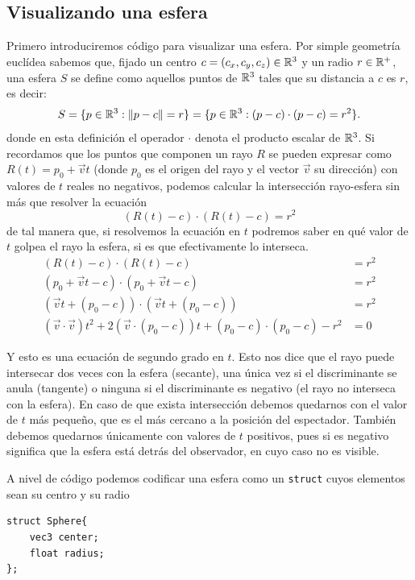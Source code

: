 \subsection{Visualizando una esfera}
\label{subsection:esfera}

Primero introduciremos código para visualizar una esfera. Por simple geometría euclídea sabemos que, fijado un centro $c=(c_x,c_y,c_z)\in\mathbb{R}^3$ y un radio $r\in\mathbb{R}^+$, una esfera $S$ se define como aquellos puntos de $\mathbb{R}^3$ tales que su distancia a $c$ es $r$, es decir:
$$
S = \{p\in\mathbb{R}^3:\|p-c\|=r\} = \{p\in\mathbb{R}^3:(p-c)\cdot (p-c)=r^2\}. 
$$
donde en esta definición el operador $\cdot$ denota el producto escalar de $\mathbb{R}^3$. Si recordamos que los puntos que componen un rayo $R$ se pueden expresar como $R(t)= p_0 + \vec vt$ (donde $p_0$ es el origen del rayo y el vector $\vec v$ su dirección) con valores de $t$ reales no negativos, podemos calcular la intersección rayo-esfera sin más que resolver la ecuación
$$
(R(t)-c)\cdot(R(t)-c)=r^2
$$
de tal manera que, si resolvemos la ecuación en $t$ podremos saber en qué valor de $t$ golpea el rayo la esfera, si es que efectivamente lo interseca.
\begin{equation}
    \label{eq:rayo-recta}
    \begin{split}
        (R(t)-c)\cdot(R(t)-c)&=r^2 \\
        (p_0 + \vec vt - c)\cdot(p_0 + \vec vt - c) &= r^2 \\
        (\vec vt + (p_0 -c))\cdot (\vec vt + (p_0 -c))&= r^2 \\
        (\vec v\cdot \vec v)t^2 + 2(\vec v\cdot(p_0-c))t + (p_0 -c)\cdot (p_0 -c) - r^2 &= 0 
    \end{split}
\end{equation}

Y esto es una ecuación de segundo grado en $t$. Esto nos dice que el rayo puede intersecar dos veces con la esfera (secante), una única vez si el discriminante se anula (tangente) o ninguna si el discriminante es negativo (el rayo no interseca con la esfera). En caso de que exista intersección debemos quedarnos con el valor de $t$ más pequeño, que es el más cercano a la posición del espectador. También debemos quedarnos únicamente con valores de $t$ positivos, pues si es negativo significa que la esfera está detrás del observador, en cuyo caso no es visible.

A nivel de código podemos codificar una esfera como un \verb|struct| cuyos elementos sean su centro y su radio

\begin{lstlisting}
struct Sphere{
    vec3 center;
    float radius;
};
\end{lstlisting}

